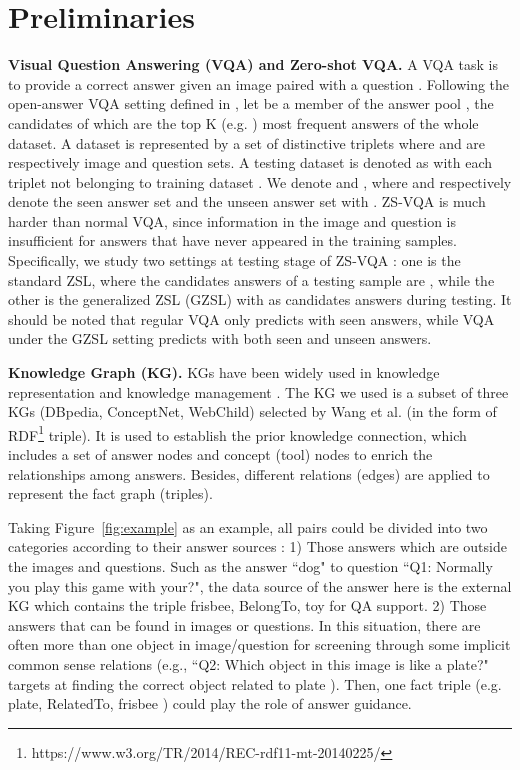 \documentclass[runningheads]{llncs}
\newcommand{\cjy}[1]{{\color{black}#1}}
\newcommand{\jeff}[1]{{\color{black}#1}}
\begin{document}
\section{Preliminaries}
\noindent\textbf{Visual Question Answering (VQA) and Zero-shot VQA.} 
A VQA task is  to \jeff{provide} a correct answer  given an image  paired with a question . 
Following the open-answer VQA setting defined in \cite{DBLP:conf/cvpr/HuCS18},   let  be a member of the answer pool , the candidates of which are the top K (e.g. ) most frequent answers of the whole dataset. 
A dataset is represented by a set of distinctive triplets  where  and  are respectively image and question sets.
\jeff{A} testing dataset is denoted as  with \cjy{each triplet  not belonging to training dataset .}
We denote  and ,
\cjy{where  and  respectively denote the seen answer set and the unseen answer set with .}
\cjy{ZS-VQA is much harder than normal VQA, since information in the image and question is insufficient for answers that have never appeared in the training samples.}
Specifically, \cjy{we study two settings at testing stage of ZS-VQA : one is the standard ZSL, where the candidates answers of a testing sample  are , 
while the other is the generalized ZSL (GZSL) with  as candidates answers during testing. }
It should be noted that regular VQA only predicts with seen answers, while VQA under the GZSL setting predicts with both seen and unseen answers.


\noindent\textbf{Knowledge Graph (KG). }
KGs have been widely used in knowledge representation and knowledge management \cite{PVGW2017,PCEH+2017} .
The KG we used is a subset of three KGs (DBpedia, ConceptNet, WebChild) \jeff{selected} by Wang et al. \cite{DBLP:journals/pami/WangWSDH18} (in the form of RDF\footnote{https://www.w3.org/TR/2014/REC-rdf11-mt-20140225/} triple). It is used to establish the prior knowledge connection,
which includes a set of answer nodes and concept (tool) nodes to enrich the relationships among answers. 
Besides, different \cjy{relations (edges)} are applied to represent the \cjy{fact graph (triples).}

Taking  Figure~\ref{fig:example} as an example, all  pairs could be divided into two categories according to their answer sources :
1) Those answers which are outside the images and questions. Such as the answer ``dog" to question ``Q1: Normally you play this game with your?", the data source of the answer here is the external KG which contains the triple frisbee, BelongTo, toy for QA support.
2) Those answers that can be found in images or questions. In this situation, there are often more than one object in image/question for screening through some implicit common sense relations (e.g., ``Q2: Which object in this image is like a plate?" targets at finding the correct object related to plate ). Then, one fact triple (e.g. plate, RelatedTo, frisbee ) could play the role of answer guidance.
\end{document}
